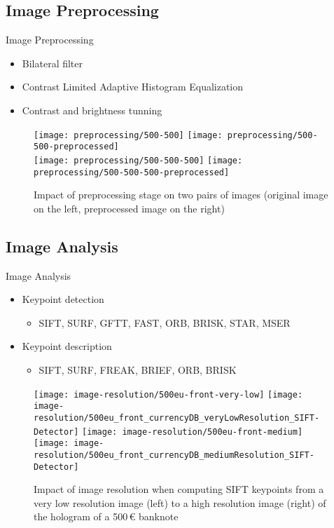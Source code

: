 \subsection{Image Preprocessing}
\begin{frame}{Image Preprocessing}
	\begin{itemize}
		\item Bilateral filter
		\item Contrast Limited Adaptive Histogram Equalization
		\item Contrast and brightness tunning
	\end{itemize}
	
	\begin{figure}[H]
		\centering
		\texttt{[image: preprocessing/500-500]}
		\texttt{[image: preprocessing/500-500-preprocessed]}\\
		\texttt{[image: preprocessing/500-500-500]}
		\texttt{[image: preprocessing/500-500-500-preprocessed]}
		\caption{Impact of preprocessing stage on two pairs of images (original image on the left, preprocessed image on the right)}
		\label{fig:preprocessing}
	\end{figure}
\end{frame}


\subsection{Image Analysis}
\begin{frame}{Image Analysis}
	\begin{itemize}
		\item Keypoint detection
		\begin{itemize}
			\item SIFT, SURF, GFTT, FAST, ORB, BRISK, STAR, MSER
		\end{itemize}
		\item Keypoint description
		\begin{itemize}
			\item SIFT, SURF, FREAK, BRIEF, ORB, BRISK
		\end{itemize}
	\end{itemize}
	
	\begin{figure}[H]
		\centering
		\texttt{[image: image-resolution/500eu-front-very-low]}\hfill
		\texttt{[image: image-resolution/500eu\_front\_currencyDB\_veryLowResolution\_SIFT-Detector]}\hfill
		\texttt{[image: image-resolution/500eu-front-medium]}\hfill
		\texttt{[image: image-resolution/500eu\_front\_currencyDB\_mediumResolution\_SIFT-Detector]}
		\caption{Impact of image resolution when computing SIFT keypoints from a very low resolution image (left) to a high resolution image (right) of the hologram of a 500\,\euro{} banknote}
		\label{fig:banknote-500-front-resolution-difference}
	\end{figure}
\end{frame}



